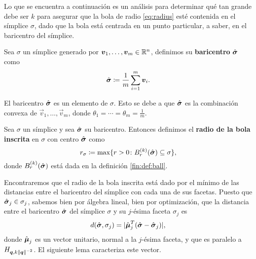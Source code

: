Lo que se encuentra a continuación es un análisis para determinar qué tan grande debe ser $k$ para
asegurar que la bola de radio \eqref{eq:radius} esté contenida en el símplice $\sigma$, dado que la
bola está centrada en un punto particular, a saber, en el baricentro del símplice.

\begin{definition}
	\label{def:barycenter}
	Sea $\sigma$ un símplice generado por $\boldsymbol{v}_1, \ldots, \boldsymbol{v}_m \in \mathbb{R}^n$, definimos su
	\textbf{baricentro} $\hat{\boldsymbol{ \sigma }}$ como
	\begin{equation*}
		\hat{\boldsymbol{ \sigma }} \coloneq \frac{1}{m} \sum_{i=1}^{m}\boldsymbol{v}_i.
	\end{equation*}
\end{definition}
\begin{observation}
	El baricentro $\hat{\boldsymbol{ \sigma }}$ es un elemento de $\sigma$. Esto se debe a que $\hat{\boldsymbol{ \sigma }}$ es la
	combinación convexa de $\vec{v}_1, \ldots, \vec{v}_m$, donde $\theta_1 = \cdots = \theta_m =
	\frac{1}{m}$.
\end{observation}

\begin{definition}
	\label{def:r-sigma}
	Sea $\sigma$ un símplice y sea $\hat{\boldsymbol{ \sigma }}$ su baricentro. Entonces definimos el \textbf{radio
	de la bola inscrita} en $\sigma$ con centro $\hat{\boldsymbol{ \sigma }}$ como
	\begin{equation}
		\label{eq:def:r-sigma}
		r_\sigma \coloneq \max \lbrace r > 0 \colon B_r^{(k)}(\hat{\boldsymbol{ \sigma }})
		\subseteq \sigma \rbrace,
	\end{equation}
	donde $B_r^{(k)}(\hat{\boldsymbol{ \sigma }})$ está dada en la definición \ref{fin:def:ball}.
\end{definition}

Encontraremos que el radio de la bola inscrita está dado por el mínimo de las distancias
entre el baricentro del símplice con cada una de sus facetas. Puesto que $\hat{\boldsymbol{ \sigma }}_j \in
\sigma_j$, sabemos bien por álgebra lineal, bien por optimización, que la distancia entre
el baricentro $\hat{\boldsymbol{ \sigma }}$ del símplice $\sigma$ y su $j$-ésima faceta $\sigma_j$ es
\begin{equation}
	\label{eq:dist:v1}
	d(\hat{\boldsymbol{ \sigma }}, \sigma_j) = |\hat{\boldsymbol{\mu}}_j^T(\hat{\boldsymbol{ \sigma }} - \hat{\boldsymbol{ \sigma }}_j)|,
\end{equation}
donde $\hat{\boldsymbol{\mu}}_j$ es un vector unitario, normal a la $j$-ésima faceta, y que
es paralelo a $H_{\boldsymbol{q}, k\left\lVert \boldsymbol{q} \right\rVert^{-2}}$. El siguiente lema caracteriza este vector.

